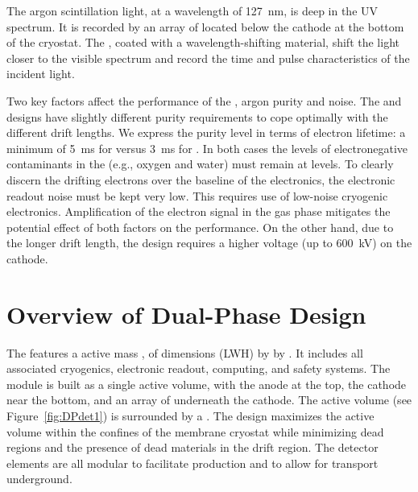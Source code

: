 The argon scintillation light, at a wavelength of  \SI{127}{nm}, is deep in the UV spectrum. It is recorded by an array of  located below the cathode at the bottom of the cryostat.  The , coated with a wavelength-shifting material, shift the light closer to the visible spectrum and record the time and pulse characteristics of the incident light.

Two key factors affect the performance of the , argon purity and noise.  The  and  designs have slightly different purity requirements to cope optimally with the different drift lengths. We express the purity level in terms of electron lifetime: a minimum of \SI{5}{ms} for  versus \SI{3}{ms} for . In both cases the levels of electronegative contaminants in the  (e.g., oxygen and water) must remain 
at  levels.  
To clearly discern the drifting electrons over the baseline of the electronics, the   electronic readout noise must be kept very low. This requires use of low-noise cryogenic electronics. 
Amplification of the electron signal in the gas phase mitigates the potential effect of both factors on the performance.  On the other hand, due to the longer drift length, the  design requires a higher voltage (up to \SI{600}{kV}) on the cathode. 



\section{Overview of Dual-Phase Design}
\label{sec:dp-execsum-description}

The  features a  \dpactivelarmass{} active mass , of dimensions (LWH) \dptpclen by \dptpcwdth by \tpcheight{}. It includes all associated cryogenics, electronic readout, computing, and safety systems. The module is built as a single active volume, with the anode at the top, the cathode near the bottom, and an array of  underneath the cathode. The active volume (see Figure~\ref{fig:DPdet1}) is surrounded by a . 
The  design maximizes the active volume within the confines of the membrane cryostat while minimizing dead regions and the presence of dead materials in the drift region.  The detector elements are all modular to facilitate production and to allow for transport underground.


